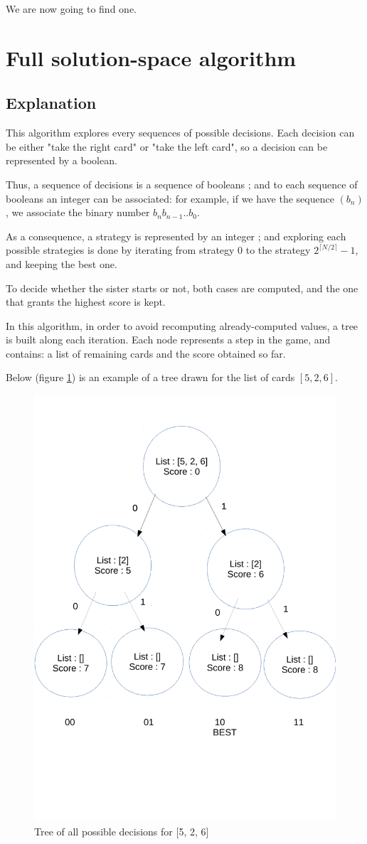 \documentclass[11pt]{article}
\begin{document}
We are now going to find one.

\section{Full solution-space algorithm}
\subsection{Explanation}
This algorithm explores every sequences of possible decisions. Each decision can
be either "take the right card" or "take the left card", so a decision can be
represented by a boolean.

Thus, a sequence of decisions is a sequence of booleans ; and to each sequence 
of booleans an integer can be associated: for example, if we have the sequence
$(b_n)$, we associate the binary number $b_nb_{n-1}..b_0$.

As a consequence, a strategy is represented by an integer ; and
exploring each possible strategies is done by iterating from strategy 0 to the
strategy $2^{\lceil{N/2}\rceil} - 1$, and keeping the best one.

To decide whether the sister starts or not, both cases are computed, and
the one that grants the highest score is kept.

In this algorithm, in order to avoid recomputing already-computed values,
a tree is built along each iteration. Each node represents a step in the game,
and contains: a list of remaining cards and the score obtained so far.

Below (figure \ref{tree}) is an example of a tree drawn 
for the list of cards $[5, 2, 6]$.
\begin{figure}[ht]
	\center
	\label{tree}
	\includegraphics[width=0.32\linewidth]{complete_space.pdf}
	\caption{Tree of all possible decisions for [5, 2, 6]}
\end{figure}
\end{document}
